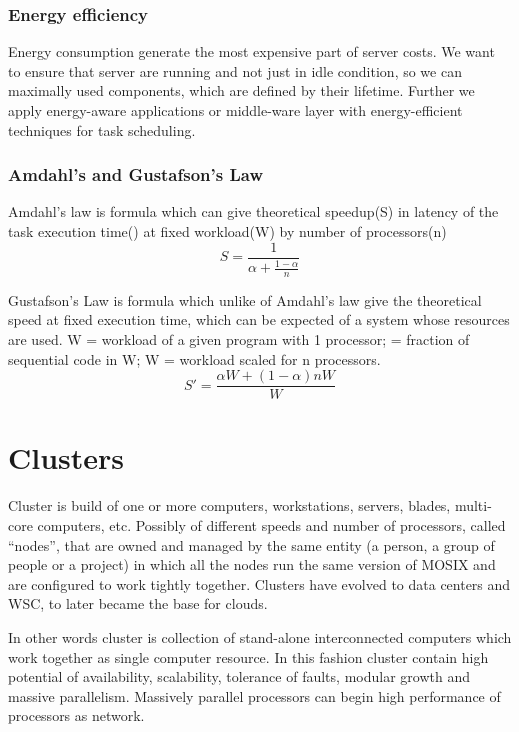 \documentclass[12pt]{report}
\begin{document}
\subsection*{Energy efficiency}
Energy consumption generate the most expensive part of server costs. We want to ensure that server are running and not just in idle condition, so we can maximally used components, which are defined by their lifetime. Further we apply energy-aware applications or middle-ware layer with energy-efficient techniques for task scheduling.

\subsection{Amdahl's and Gustafson's Law}
Amdahl's law is formula which can give theoretical speedup(S) in latency of the task execution time(\textalpha) at fixed workload(W) by number of processors(n)
\begin{equation}
S = \frac{1}{\alpha + \frac{1-\alpha}{n}}
\end{equation}

Gustafson's Law is formula which unlike of Amdahl's law give the theoretical speed at fixed execution time, which can be expected of a system whose resources are used.
W = workload of a given program with 1 processor; \textalpha = fraction of sequential code in W; W = workload scaled for n processors.
\begin{equation}
S' = \frac{\alpha W + (1 - \alpha )nW}{W}
\end{equation}

\chapter{Clusters}
Cluster is build of one or more computers, workstations, servers, blades, multi-core computers, etc. Possibly of different speeds and number of processors, called “nodes”, that are owned and managed by the same entity (a person, a group of people or a project) in which all the nodes run the same version of MOSIX and are configured to work tightly together.
Clusters have evolved to data centers and WSC, to later became the base for clouds.

In other words cluster is collection of stand-alone interconnected computers which work together as single computer resource. In this fashion cluster contain high potential of availability, scalability, tolerance of faults, modular growth and massive parallelism. Massively parallel processors can begin high performance of processors as network.
\end{document}

